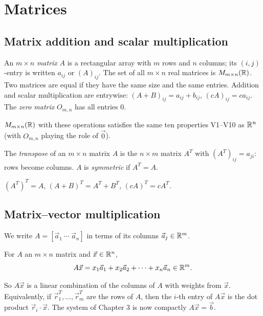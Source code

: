 \chapter{Matrices}

\section{Matrix addition and scalar multiplication}

\begin{definition}
An $m\times n$ \emph{matrix} $A$ is a rectangular array with $m$ rows and $n$ columns; its
$(i,j)$-entry is written $a_{ij}$ or $(A)_{ij}$. The set of all $m\times n$ real matrices is
$M_{m\times n}(\mathbb{R})$. Two matrices are equal if they have the same size and the same entries. Addition and
scalar multiplication are entrywise: $(A+B)_{ij}=a_{ij}+b_{ij}$, $(cA)_{ij}=ca_{ij}$. The
\emph{zero matrix} $O_{m,n}$ has all entries $0$.
\end{definition}

\begin{theorem}
$M_{m\times n}(\mathbb{R})$ with these operations satisfies the same ten properties V1--V10 as $\mathbb{R}^n$ (with
$O_{m,n}$ playing the role of $\vec 0$).
\end{theorem}

\begin{definition}[Transpose]
The \emph{transpose} of an $m\times n$ matrix $A$ is the $n\times m$ matrix $A^T$ with
$(A^T)_{ij}=a_{ji}$: rows become columns. $A$ is \emph{symmetric} if $A^T=A$.
\end{definition}

\begin{theorem}
$(A^T)^T=A$, $(A+B)^T=A^T+B^T$, $(cA)^T=cA^T$.
\end{theorem}

\section{Matrix--vector multiplication}

We write $A=[\vec a_1\ \cdots\ \vec a_n]$ in terms of its columns $\vec a_j\in\mathbb{R}^m$.

\begin{definition}
For $A$ an $m\times n$ matrix and $\vec x\in\mathbb{R}^n$,
\[
  A\vec x = x_1\vec a_1 + x_2\vec a_2+\dots+x_n\vec a_n\in\mathbb{R}^m .
\]
\end{definition}

So $A\vec x$ is a linear combination of the columns of $A$ with weights from $\vec x$. Equivalently,
if $\vec r_1^T,\dots,\vec r_m^T$ are the rows of $A$, then the $i$-th entry of $A\vec x$ is the dot
product $\vec r_i\cdot\vec x$. The system of Chapter 3 is now compactly $A\vec x=\vec b$.

